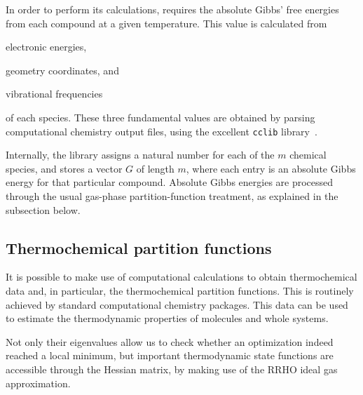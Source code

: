 In order to perform its calculations,
\overreact{} requires the absolute Gibbs' free energies from each compound at a given temperature.
This value is calculated from
\begin{enumerate*}
	\item electronic energies,
	\item geometry coordinates,
	      and
	\item vibrational frequencies
\end{enumerate*}
of each species.
These three fundamental values are obtained
by parsing computational chemistry output files,
using the excellent \texttt{cclib} library~\cite{O_boyle_2008}.

Internally,
the library assigns a natural number for each of the $m$ chemical species,
and stores a vector $G$ of length $m$,
where each entry is an absolute Gibbs energy for that particular compound.
Absolute Gibbs energies are processed through the usual gas-phase partition-function treatment,
as explained in the subsection below.

\subsection{Thermochemical partition functions}%
\label{sec:rrho}

It is possible to make use of computational calculations to obtain
thermochemical data and,
in particular,
the thermochemical partition
functions.
This is routinely achieved by standard computational chemistry packages.
This data can be used to estimate the thermodynamic properties of molecules and
whole systems.

Not only their eigenvalues allow us to check whether an optimization indeed reached a local minimum,
but important thermodynamic state functions are accessible through the Hessian matrix,
by making use of the RRHO ideal gas approximation.

